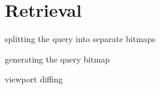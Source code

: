 \section{Retrieval}

splitting the query into separate bitmaps

generating the query bitmap

viewport diffing

